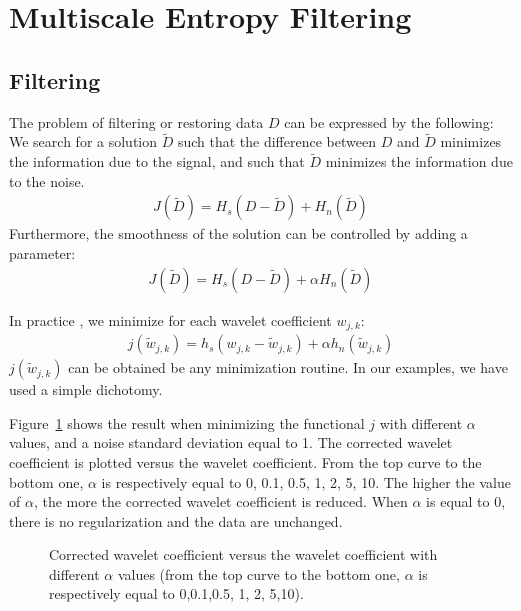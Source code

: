 \section{Multiscale Entropy Filtering}
\subsection{Filtering}

The problem of filtering or restoring data $D$ can be expressed by the 
following: 
We search for a solution $\tilde D$ such that the difference between
$D$ and $\tilde D$ minimizes the information due to the signal, and 
such that  $\tilde D$ minimizes the information due to the noise. 
\begin{eqnarray}
J(\tilde D) = H_s(D-\tilde D) + H_n(\tilde D)
\label{eqn_func1}
\end{eqnarray}
Furthermore, the smoothness of the solution can be controlled by adding
a parameter:
\begin{eqnarray}
J(\tilde D) = H_s(D-\tilde D) + \alpha H_n(\tilde D)
\label{eqn_func2}
\end{eqnarray}

In practice \cite{rest:chambolle98}, we minimize for each wavelet coefficient $w_{j,k}$:
\begin{eqnarray}
j(\tilde w_{j,k}) = h_s(w_{j,k}-\tilde w_{j,k}) + \alpha h_n(\tilde w_{j,k})
\label{eqn_func_coef}
\end{eqnarray}
$j(\tilde w_{j,k})$ can be obtained be any minimization routine. In our examples,
we have used a simple dichotomy. 

Figure~\ref{fig_tab1} shows the result when minimizing the functional $j$ with
different $\alpha$ values, and a noise standard deviation equal to 1. 
The corrected wavelet coefficient is plotted versus the 
wavelet coefficient. From the top curve to the bottom one, 
$\alpha$ is respectively equal to 0, 0.1, 0.5, 1, 2, 5, 10. 
The higher the value of $\alpha$, the 
more the corrected wavelet coefficient is reduced. When $\alpha$ is equal 
to 0, there is no regularization and the data are unchanged.

\begin{figure}[htb]
\centerline{
\vbox{
}}
\caption{Corrected wavelet coefficient versus the wavelet coefficient with
different $\alpha$ values (from the top curve to the bottom one, 
$\alpha$ is respectively equal to 0,0.1,0.5, 1, 2, 5,10).}
\label{fig_tab1}
\end{figure}

